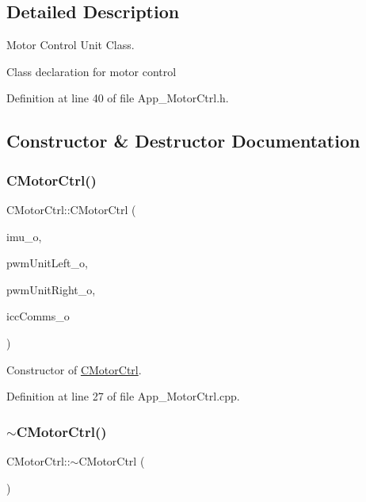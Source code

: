 \subsection{Detailed Description}
Motor Control Unit Class. 

Class declaration for motor control 

Definition at line 40 of file App\+\_\+\+Motor\+Ctrl.\+h.



\subsection{Constructor \& Destructor Documentation}
\mbox{\label{class_c_motor_ctrl_aa0093ebb4e0da5e22f829f717762a487}} 
\subsubsection{\texorpdfstring{CMotorCtrl()}{CMotorCtrl()}}
{\footnotesize\ttfamily C\+Motor\+Ctrl\+::\+C\+Motor\+Ctrl (\begin{DoxyParamCaption}\item[{\mbox{\hyperlink{class_c_i_m_u_unit}{C\+I\+M\+U\+Unit}} \&}]{imu\+\_\+o,  }\item[{\mbox{\hyperlink{class_c_p_w_m_unit}{C\+P\+W\+M\+Unit}} \&}]{pwm\+Unit\+Left\+\_\+o,  }\item[{\mbox{\hyperlink{class_c_p_w_m_unit}{C\+P\+W\+M\+Unit}} \&}]{pwm\+Unit\+Right\+\_\+o,  }\item[{\mbox{\hyperlink{class_c_i_c_c_comms}{C\+I\+C\+C\+Comms}} \&}]{icc\+Comms\+\_\+o }\end{DoxyParamCaption})}



Constructor of \mbox{\hyperlink{class_c_motor_ctrl}{C\+Motor\+Ctrl}}. 



Definition at line 27 of file App\+\_\+\+Motor\+Ctrl.\+cpp.

\mbox{\label{class_c_motor_ctrl_a97e5fbdf11c6562a7895cf4079003132}} 
\subsubsection{\texorpdfstring{$\sim$CMotorCtrl()}{~CMotorCtrl()}}
{\footnotesize\ttfamily C\+Motor\+Ctrl\+::$\sim$\+C\+Motor\+Ctrl (\begin{DoxyParamCaption}{ }\end{DoxyParamCaption})}



